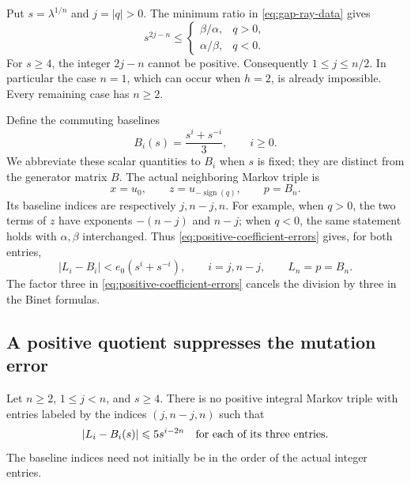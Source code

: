 Put $s=\lambda^{1/n}$ and $j=|q|>0$. The minimum ratio in
\eqref{eq:gap-ray-data} gives
\begin{equation}\label{eq:positive-index-normalization}
 s^{2j-n}\leqslant
 \begin{cases}
 \beta/\alpha,&q>0,\\
 \alpha/\beta,&q<0.
 \end{cases}
\end{equation}
For $s\geqslant4$, the integer $2j-n$ cannot be positive.
Consequently $1\leqslant j\leqslant n/2$. In particular the case
$n=1$, which can occur when $h=2$, is already impossible. Every
remaining case has $n\geqslant2$.

Define the commuting baselines
\begin{equation}\label{eq:positive-baselines}
 B_i(s)=\frac{s^i+s^{-i}}3,\qquad i\geqslant0.
\end{equation}
We abbreviate these scalar quantities to $B_i$ when $s$ is fixed;
they are distinct from the generator matrix $B$. The actual neighboring
Markov triple is
$$
 x=u_0,\qquad z=u_{-\operatorname{sign}(q)},\qquad p=B_n.
$$
Its baseline indices are respectively $j,n-j,n$. For example, when
$q>0$, the two terms of $z$ have exponents $-(n-j)$ and $n-j$;
when $q<0$, the same statement holds with $\alpha,\beta$ interchanged.
Thus \eqref{eq:positive-coefficient-errors} gives, for both entries,
\begin{equation}\label{eq:positive-initial-errors}
 |L_i-B_i|<e_0(s^i+s^{-i}),\qquad i=j,n-j,
 \qquad L_n=p=B_n.
\end{equation}
The factor three in \eqref{eq:positive-coefficient-errors} cancels
the division by three in the Binet formulas.

\subsection{A positive quotient suppresses the mutation error}

\begin{lemma}\label{lem:uniform-vieta}
Let $n\geqslant2$, $1\leqslant j<n$, and $s\geqslant4$.
There is no positive integral Markov triple with entries labeled by
the indices $(j,n-j,n)$ such that
\begin{equation}\label{eq:positive-vieta-hypothesis}
 |L_i-B_i(s)|\leqslant5s^{i-2n}
 \quad\hbox{for each of its three entries}.
\end{equation}
The baseline indices need not initially be in the order of the actual
integer entries.
\end{lemma}

